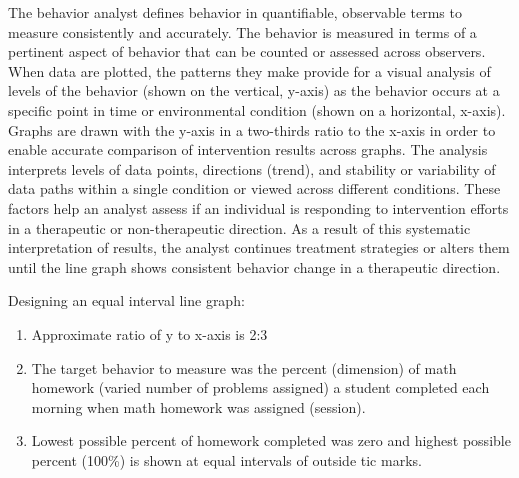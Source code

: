 The behavior analyst defines behavior in quantifiable, observable terms to measure consistently and accurately. The behavior is measured in terms of a pertinent aspect of behavior that can be counted or assessed across observers. When data are plotted, the patterns they make provide for a visual analysis of levels of the behavior (shown on the vertical, y-axis) as the behavior occurs at a specific point in time or environmental condition (shown on a horizontal, x-axis). Graphs are drawn with the y-axis in a two-thirds ratio to the x-axis in order to enable accurate comparison of intervention results across graphs. The analysis interprets levels of data points, directions (trend), and stability or variability of data paths within a single condition or viewed across different conditions. These factors help an analyst assess if an individual is responding to intervention efforts in a therapeutic or non-therapeutic direction. As a result of this systematic interpretation of results, the analyst continues treatment strategies or alters them until the line graph shows consistent behavior change in a therapeutic direction.

Designing an equal interval line graph:
\begin{enumerate}
\item Approximate ratio of y to x-axis is 2:3
\item The target behavior to measure was the percent (dimension) of math homework (varied number of problems assigned) a student completed each morning when math homework was assigned (session).
\item Lowest possible percent of homework completed was zero and highest possible percent (100\%) is shown at equal intervals of outside tic marks.
\end{enumerate}

